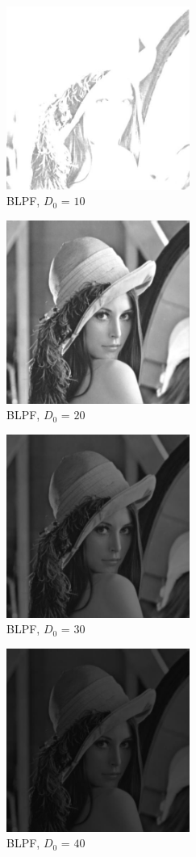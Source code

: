 \documentclass[conference]{IEEEtran}
\begin{document}
\begin{figure}[H]
\centerline{\includegraphics[width=6cm]{BLPF10.jpg}}
\caption{BLPF, $D_0$ = $10$}
\label{BLPF10}
\end{figure}

\begin{figure}[H]
\centerline{\includegraphics[width=6cm]{BLPF20.jpg}}
\caption{BLPF, $D_0$ = $20$}
\label{BLPF20}
\end{figure}

\begin{figure}[H]
\centerline{\includegraphics[width=6cm]{BLPF30.jpg}}
\caption{BLPF, $D_0$ = $30$}
\label{BLPF30}
\end{figure}

\begin{figure}[H]
\centerline{\includegraphics[width=6cm]{BLPF40.jpg}}
\caption{BLPF, $D_0$ = $40$}
\label{BLPF40}
\end{figure}
\end{document}
